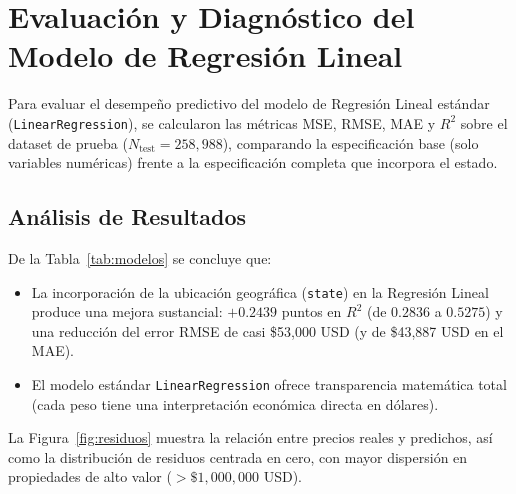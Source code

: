 \documentclass[11pt,a4paper]{article}
\begin{document}
\section{Evaluación y Diagnóstico del Modelo de Regresión Lineal}

Para evaluar el desempeño predictivo del modelo de Regresión Lineal estándar (\texttt{LinearRegression}), se calcularon las métricas MSE, RMSE, MAE y $R^2$ sobre el dataset de prueba ($N_{\text{test}} = 258{,}988$), comparando la especificación base (solo variables numéricas) frente a la especificación completa que incorpora el estado.

\begin{table}[H]
\centering
\caption{Desempeño del modelo de Regresión Lineal en el dataset de prueba ($N_{\text{test}} = 258{,}988$).}
\label{tab:modelos}
\end{table}

\subsection{Análisis de Resultados}
De la Tabla~\ref{tab:modelos} se concluye que:
\begin{itemize}
    \item La incorporación de la ubicación geográfica (\texttt{state}) en la Regresión Lineal produce una mejora sustancial: $+0.2439$ puntos en $R^2$ (de $0.2836$ a $0.5275$) y una reducción del error RMSE de casi \$53{,}000 USD (y de \$43{,}887 USD en el MAE).
    \item El modelo estándar \texttt{LinearRegression} ofrece transparencia matemática total (cada peso tiene una interpretación económica directa en dólares).
\end{itemize}

La Figura~\ref{fig:residuos} muestra la relación entre precios reales y predichos, así como la distribución de residuos centrada en cero, con mayor dispersión en propiedades de alto valor ($>\$1{,}000{,}000$ USD).
\end{document}
